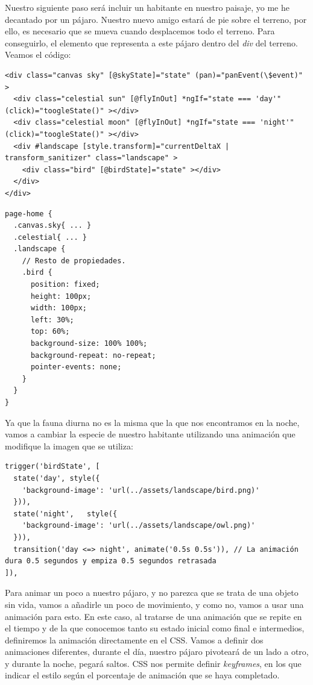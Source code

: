 Nuestro siguiente paso será incluir un habitante en nuestro paisaje, yo me he decantado por un pájaro. Nuestro nuevo amigo estará de pie sobre el terreno, por ello, es necesario que se mueva cuando desplacemos todo el terreno. Para conseguirlo, el elemento que representa a este pájaro dentro del \emph{div} del terreno. Veamos el código:

\noindent
\begin{minipage}[t]{.48\textwidth}
{\begin{lstlisting}[style=htmlcssjs,frame=tlrb, xleftmargin={0.2cm}]
<div class="canvas sky" [@skyState]="state" (pan)="panEvent(\$event)" >
  <div class="celestial sun" [@flyInOut] *ngIf="state === 'day'" (click)="toogleState()" ></div>
  <div class="celestial moon" [@flyInOut] *ngIf="state === 'night'" (click)="toogleState()" ></div>
  <div #landscape [style.transform]="currentDeltaX | transform_sanitizer" class="landscape" >
    <div class="bird" [@birdState]="state" ></div>
  </div>
</div>
\end{lstlisting}}
\end{minipage}\hfill
\noindent
\begin{minipage}[t]{.48\textwidth}
{\begin{lstlisting}[style=htmlcssjs,frame=tlrb, xleftmargin={0.2cm}]
page-home {
  .canvas.sky{ ... }
  .celestial{ ... }
  .landscape {
    // Resto de propiedades.
    .bird {
      position: fixed;
      height: 100px;
      width: 100px;
      left: 30%;
      top: 60%;
      background-size: 100% 100%;
      background-repeat: no-repeat;
      pointer-events: none;
    }
  }
}
\end{lstlisting}}
\end{minipage}

Ya que la fauna diurna no es la misma que la que nos encontramos en la noche, vamos a cambiar la especie de nuestro habitante utilizando una animación que modifique la imagen que se utiliza:

{\begin{lstlisting}[style=htmlcssjs,frame=tlrb, xleftmargin={0.2cm}]
trigger('birdState', [
  state('day', style({
    'background-image': 'url(../assets/landscape/bird.png)'
  })),
  state('night',   style({
    'background-image': 'url(../assets/landscape/owl.png)'
  })),
  transition('day <=> night', animate('0.5s 0.5s')), // La animación dura 0.5 segundos y empiza 0.5 segundos retrasada
]),
\end{lstlisting}}

Para animar un poco a nuestro pájaro, y no parezca que se trata de una objeto sin vida, vamos a añadirle un poco de movimiento, y como no, vamos a usar una animación para esto. En este caso, al tratarse de una animación que se repite en el tiempo y de la que conocemos tanto su estado inicial como final e intermedios, definiremos la animación directamente en el \gls{CSS}. Vamos a definir dos animaciones diferentes, durante el día, nuestro pájaro pivoteará de un lado a otro, y durante la noche, pegará saltos. \gls{CSS} nos permite definir \emph{keyframes}, en los que indicar el estilo según el porcentaje de animación que se haya completado.

